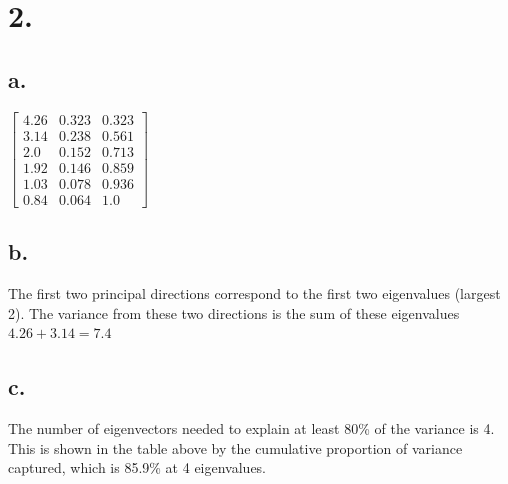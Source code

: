 \documentclass[11pt]{article}
\begin{document}
\section*{2.}
\label{sec:orgedd4c9e}
\subsection*{a.}
\label{sec:orgb1ebb68}
\(\begin{bmatrix} 4.26 & 0.323 & 0.323 \\
3.14 & 0.238 & 0.561 \\
2.0 & 0.152 & 0.713 \\
1.92 & 0.146 & 0.859 \\
1.03 & 0.078 & 0.936 \\
0.84 & 0.064 & 1.0 \end{bmatrix}\)
\subsection*{b.}
\label{sec:org32a33c6}
The first two principal directions correspond to the first two eigenvalues
(largest 2). The variance from these two directions is the sum of these
eigenvalues \(4.26 + 3.14 = 7.4\)
\subsection*{c.}
\label{sec:orge50115a}
The number of eigenvectors needed to explain at least 80\% of the variance is 4.
This is shown in the table above by the cumulative proportion of variance
captured, which is 85.9\% at 4 eigenvalues.
\end{document}

